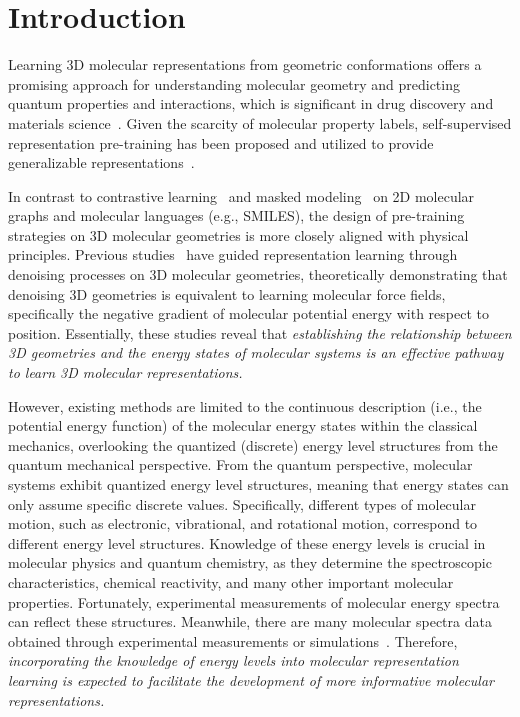 \section{Introduction}

Learning 3D molecular representations from geometric conformations offers a promising approach for understanding molecular geometry and predicting quantum properties and interactions, which is significant in drug discovery and materials science~\citep{Allegro,MACE,Equiformer,HMR,LEFTNet}. Given the scarcity of molecular property labels, self-supervised representation pre-training has been proposed and utilized to provide generalizable representations~\citep{Pre-GNN,GROVER,doi:10.1089/cmb.2023.0187}.

In contrast to contrastive learning~\citep{MolCLR,D-SLA} and masked modeling~\citep{GraphMAE,SimSGT,AUG-MAE} on 2D molecular graphs and molecular languages (e.g., SMILES), the design of pre-training strategies on 3D molecular geometries is more closely aligned with physical principles. Previous studies~\citep{Coord,3D-EMGP} have guided representation learning through denoising processes on 3D molecular geometries, theoretically demonstrating that denoising 3D geometries is equivalent to learning molecular force fields, specifically the negative gradient of molecular potential energy with respect to position. Essentially, these studies reveal that \textit{establishing the relationship between 3D geometries and the energy states of molecular systems is an effective pathway to learn 3D molecular representations.}

However, existing methods are limited to the continuous description (i.e., the potential energy function) of the molecular energy states within the classical mechanics, overlooking the quantized (discrete) energy level structures from the quantum mechanical perspective. 
From the quantum  perspective, molecular systems exhibit quantized energy level structures, meaning that energy states can only assume specific discrete values. 
Specifically, different types of molecular motion, such as electronic, vibrational, and rotational motion, correspond to different energy level structures. Knowledge of these energy levels is crucial in molecular physics and quantum chemistry, as they determine the spectroscopic characteristics, chemical reactivity, and many other important molecular properties. Fortunately, experimental measurements of molecular energy spectra can reflect these structures. Meanwhile, there are many molecular spectra data obtained through experimental measurements or simulations~\citep{DetaNet, multimodal-spectra}. Therefore, \textit{incorporating the knowledge of energy levels into molecular representation learning is expected to facilitate the development of more informative molecular representations.}

